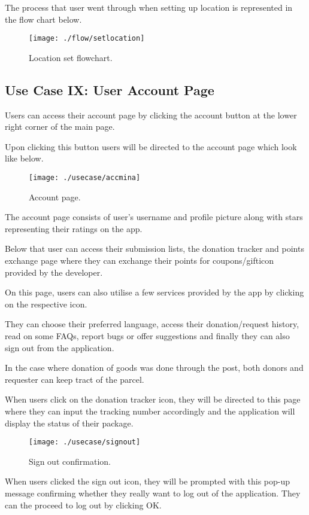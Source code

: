 \documentclass[conference]{IEEEtran}
\begin{document}
The process that user went through when setting up location is represented in the flow chart below.

\begin{figure}[h!]
\texttt{[image: ./flow/setlocation]}
\centering
\caption{Location set flowchart.}
\end{figure}

\subsection{Use Case IX: User Account Page}
Users can access their account page by clicking the account button at the lower right corner of the main page.

Upon clicking this button users will be directed to the account page which look like below.

\begin{figure}[h!]
\texttt{[image: ./usecase/accmina]}
\centering
\caption{Account page.}
\end{figure}

The account page consists of user’s username and profile picture along with stars representing their ratings on the app. 

Below that user can access their submission lists, the donation tracker and points exchange page where they can exchange their points for coupons/gifticon provided by the developer. 

On this page, users can also utilise a few services provided by the app by clicking on the respective icon.

They can choose their preferred language, access their donation/request history, read on some FAQs, report bugs or offer suggestions and finally they can also sign out from the application.

In the case where donation of goods was done through the post, both donors and requester can keep tract of the parcel.

When users click on the donation tracker icon, they will be directed to this page where they can input the tracking number accordingly and the application will display the status of their package.

\begin{figure}[h!]
\texttt{[image: ./usecase/signout]}
\centering
\caption{Sign out confirmation.}
\end{figure}

When users clicked the sign out icon, they will be prompted with this pop-up message confirming whether they really want to log out of the application. They can the proceed to log out by clicking OK.  \break   
\end{document}
